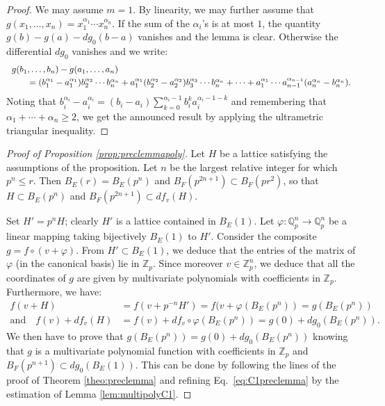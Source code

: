 \documentclass[11pt]{article}
\numberwithin{equation}{section}
\numberwithin{figure}{section}
\renewcommand{\leq}{\leqslant}
\renewcommand{\geq}{\geqslant}
\theoremstyle{definition}
\newcommand{\Z}{\mathbb Z}
\newcommand{\Zp}{\Z_p}
\newcommand{\Q}{\mathbb Q}
\newcommand{\Qp}{\Q_p}
\begin{document}
\begin{proof}
We may assume $m = 1$. By linearity, we may further assume that
$g(x_1, \ldots, x_n) = x_1^{\alpha_1} \cdots x_n^{\alpha_n}$. If the
sum of the $\alpha_i$'s is at most $1$, the quantity $g(b) - g(a) - 
dg_0(b{-}a)$ vanishes and the lemma is clear. Otherwise the differential
$dg_0$ vanishes and we write:
$$\begin{array}{l}
g(b_1, \ldots, b_n) - g(a_1, \ldots, a_n) \smallskip \\
\hspace{2em}
=  (b_1^{\alpha_1} - a_1^{\alpha_1}) b_2^{\alpha_2} \cdots b_n^{\alpha_n} 
 + a_1^{\alpha_1} (b_2^{\alpha_2} - a_2^{\alpha_2}) b_3^{\alpha_3} \cdots b_n^{\alpha_n} 
 + \cdots 
 + a_1^{\alpha_1} \cdots a_{n-1}^{\alpha_{n-1}} (a_n^{\alpha_n} - b_n^{\alpha_n}).
\end{array}$$
Noting that $b_i^{\alpha_i} - a_i^{\alpha_i} = 
(b_i - a_i) \sum_{k=0}^{\alpha_i-1} b_i^k a_i^{\alpha_i-1-k}$ and
remembering that $\alpha_1 + \cdots + \alpha_n \geq 2$, we get 
the announced result by applying the ultrametric triangular
inequality.
\end{proof}

\begin{proof}[Proof of Proposition \ref{prop:preclemmapoly}]
Let $H$ be a lattice satisfying the assumptions of the proposition. 
Let $n$ be the largest relative integer for which $p^n \leq r$. 
Then $B_E(r) = B_E(p^n)$ and $B_F(p^{2n+1}) \subset B_F(p r^2)$, so 
that $H \subset B_E(p^n)$ and $B_F(p^{2n+1}) \subset df_v(H)$.

Set $H' = p^n H$; clearly $H'$ is a lattice contained in $B_E(1)$. Let 
$\varphi : \Qp^n \to \Qp^n$ be a linear mapping taking bijectively 
$B_E(1)$ to $H'$. Consider the composite $g = f \circ (v + \varphi)$. 
From $H' \subset B_E(1)$, we deduce that the entries of the matrix of 
$\varphi$ (in the canonical basis) lie in $\Zp$. Since moreover $v \in
\Zp^n$, we deduce that all the coordinates of $g$ are given by
multivariate polynomials with coefficients in $\Zp$. Furthermore, we
have:
\begin{align*}
f(v+H) & = f(v + p^{-n} H') = f(v + \varphi(B_E(p^n)) = g(B_E(p^n)) \\
\text{and}\quad
f(v) + df_v(H) & = f(v) + df_v \circ \varphi(B_E(p^n)) = g(0) + dg_0(B_E(p^n)).
\end{align*}
We then have to prove that $g(B_E(p^n)) = g(0) + dg_0(B_E(p^n))$
knowing that $g$ is a multivariate polynomial function with coefficients
in $\Zp$ and $B_F(p^{n+1}) \subset dg_0(B_E(1))$. This can be done by
following the lines of the proof of Theorem \ref{theo:preclemma} and
refining Eq.~\eqref{eq:C1preclemma} by the estimation of Lemma
\ref{lem:multipolyC1}.
\end{proof}
\end{document}
